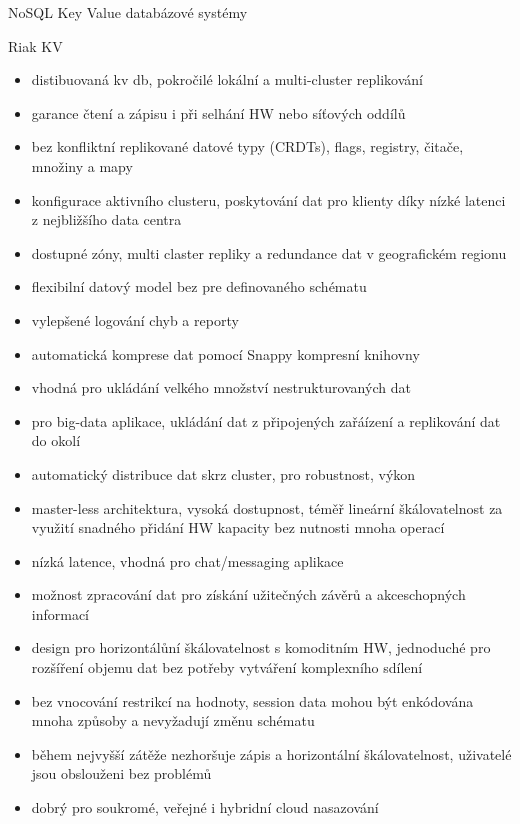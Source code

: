 \documentclass{article}
\begin{document}
\begin{section}{NoSQL Key Value databázové systémy}
		\begin{subsection}{Riak KV}
			\begin{itemize}
				\item distibuovaná kv db, pokročilé lokální a multi-cluster replikování
				\item garance čtení a zápisu i při selhání HW nebo síťových oddílů
				\item bez konfliktní replikované datové typy (CRDTs), flags, registry, čitače, množiny a mapy
				\item konfigurace aktivního clusteru, poskytování dat pro klienty díky nízké latenci z nejbližšího data centra
				\item dostupné zóny, multi claster repliky a redundance dat v geografickém regionu
				\item flexibilní datový model bez pre definovaného schématu
				\item vylepšené logování chyb a reporty
				\item automatická komprese dat pomocí Snappy kompresní knihovny
				\item vhodná pro ukládání velkého množství nestrukturovaných dat
				\item pro big-data aplikace, ukládání dat z připojených zařáízení a replikování dat do okolí
				\item automatický distribuce dat skrz cluster, pro robustnost, výkon
				\item master-less architektura, vysoká dostupnost, téměř lineární škálovatelnost za využití snadného přidání HW kapacity bez nutnosti mnoha operací
				\item nízká latence, vhodná pro chat/messaging aplikace
				\item možnost zpracování dat pro získání užitečných závěrů a akceschopných informací
				\item design pro horizontálůní škálovatelnost s komoditním HW, jednoduché pro rozšíření objemu dat bez potřeby vytváření komplexního sdílení
				\item bez vnocování restrikcí na hodnoty, session data mohou být enkódována mnoha způsoby a nevyžadují změnu schématu
				\item během nejvyšší zátěže nezhoršuje zápis a horizontální škálovatelnost, uživatelé jsou obslouženi bez problémů
				\item dobrý pro soukromé, veřejné i hybridní cloud nasazování
			\end{itemize}
		\end{subsection}
		

\end{section}
\end{document}
